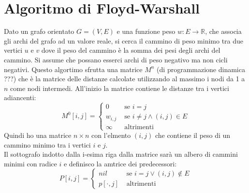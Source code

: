 \documentclass[a4paper,12pt, oneside]{book}
\begin{document}
\section{Algoritmo di Floyd-Warshall}
Dato un grafo orientato $G=(V,E)$ e una funzione peso $w:E\to
\mathbb{R}$, che associa gli archi del grafo ad un valore reale, si
cerca il cammino di peso minimo tra due vertici $u$ e $v$ dove il peso
del cammino è la somma dei pesi degli archi del cammino. Si assume che
possano esserci archi di peso negativo ma non cicli negativi. Questo
algortimo sfrutta una matrice $M^n$ (di programmazione dinamica ???)
che è la matrice delle distanze calcolate utilizzando al massimo i
nodi da 1 a $n$ come nodi intermedi. All'inizio la matrice contiene le
distanze tra i vertici adiancenti:
\[M^0[i,j]=
  \begin{cases}
    0 & \mbox{ se } i=j\\
    w_{i,j} & \mbox{ se } i\neq j \wedge (i,j)\in E\\
    \infty & \mbox{ altrimenti}
  \end{cases}
\]
Quindi ho una matrice $n\times n$ con l'elmento $(i,j)$ che contiene
il peso di un cammino minimo tra i vertici $i$ e $j$. \\
Il sottografo indotto dalla i-esima riga dalla matrice sarà un albero
di cammini minimi con radice $i$ e definisco la amtrice dei
predecessori:
\[P[i,j]=
  \begin{cases}
    nil & \mbox{ se } i=j\vee (i,j)\not\in E\\
    p[\cdot, j] & \mbox{ altrimenti}
  \end{cases}
\]
\end{document}
